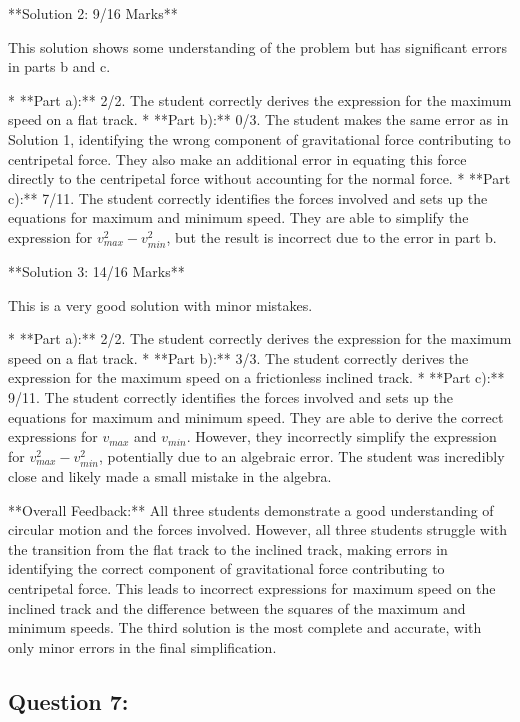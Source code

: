 \documentclass[a4paper,11pt]{article}
\begin{document}
**Solution 2: 9/16 Marks**

This solution shows some understanding of the problem but has significant errors in parts b and c.

*   **Part a):** 2/2. The student correctly derives the expression for the maximum speed on a flat track.
*   **Part b):** 0/3. The student makes the same error as in Solution 1, identifying the wrong component of gravitational force contributing to centripetal force. They also make an additional error in equating this force directly to the centripetal force without accounting for the normal force.
*   **Part c):** 7/11. The student correctly identifies the forces involved and sets up the equations for maximum and minimum speed. They are able to simplify the expression for \(v^2_{max} - v^2_{min}\), but the result is incorrect due to the error in part b.

**Solution 3: 14/16 Marks**

This is a very good solution with minor mistakes.

*   **Part a):** 2/2. The student correctly derives the expression for the maximum speed on a flat track.
*   **Part b):** 3/3. The student correctly derives the expression for the maximum speed on a frictionless inclined track.
*   **Part c):** 9/11. The student correctly identifies the forces involved and sets up the equations for maximum and minimum speed. They are able to derive the correct expressions for \(v_{max}\) and \(v_{min}\). However, they incorrectly simplify the expression for \(v^2_{max} - v^2_{min}\), potentially due to an algebraic error. The student was incredibly close and likely made a small mistake in the algebra.

**Overall Feedback:**
All three students demonstrate a good understanding of circular motion and the forces involved. However, all three students struggle with the transition from the flat track to the inclined track, making errors in identifying the correct component of gravitational force contributing to centripetal force. This leads to incorrect expressions for maximum speed on the inclined track and the difference between the squares of the maximum and minimum speeds. The third solution is the most complete and accurate, with only minor errors in the final simplification.

\subsection*{Question 7:}
\end{document}
